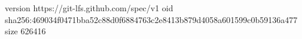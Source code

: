 version https://git-lfs.github.com/spec/v1
oid sha256:469034f0471bba52c88d0f6884763c2e8413b879d4058a601599c0b59136a477
size 626416
